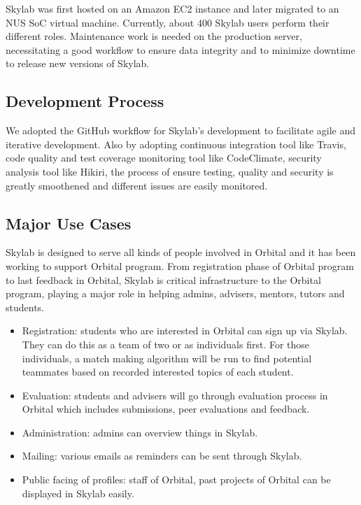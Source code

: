 Skylab was first hosted on an Amazon EC2 instance and later migrated to an NUS SoC virtual machine. Currently, about 400 Skylab users perform their different roles.  Maintenance work is needed on the production server, necessitating a good workflow to ensure data integrity and to minimize downtime to release new versions of Skylab.

\subsection{Development Process}

We adopted the GitHub workflow for Skylab's development to facilitate agile and iterative development. Also by adopting continuous integration tool like Travis, code quality and test coverage monitoring tool like CodeClimate, security analysis tool like Hikiri, the process of ensure testing, quality and security is greatly smoothened and different issues are easily monitored.

\subsection{Major Use Cases}

Skylab is designed to serve all kinds of people involved in Orbital and it has been working to support Orbital program. From registration phase of Orbital program to last feedback in Orbital, Skylab is critical infrastructure  to the Orbital program, playing a major role in helping admins, advisers, mentors, tutors and students.

\begin{itemize}
  \item Registration: students who are interested in Orbital can sign up via Skylab. They can do this as a team of two or as individuals first. For those individuals, a match making algorithm will be run to find potential teammates based on recorded interested topics of each student.
  \item Evaluation: students and advisers will go through evaluation process in Orbital which includes submissions, peer evaluations and feedback.
  \item Administration: admins can overview things in Skylab.
  \item Mailing: various emails as reminders can be sent through Skylab.
  \item Public facing of profiles: staff of Orbital, past projects of Orbital can be displayed in Skylab easily.
\end{itemize}

